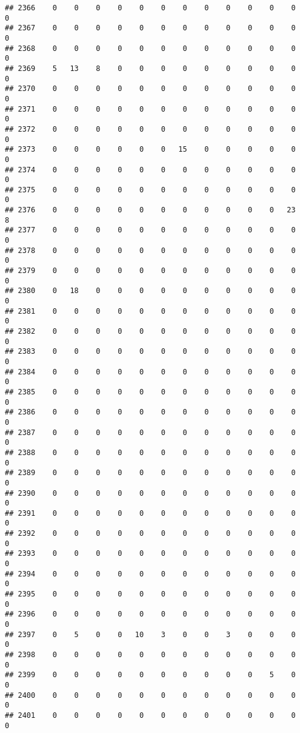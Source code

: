 \documentclass[]{article}
\begin{document}
\begin{verbatim}
## 2366    0    0    0    0    0    0    0    0    0    0    0    0    0
## 2367    0    0    0    0    0    0    0    0    0    0    0    0    0
## 2368    0    0    0    0    0    0    0    0    0    0    0    0    0
## 2369    5   13    8    0    0    0    0    0    0    0    0    0    0
## 2370    0    0    0    0    0    0    0    0    0    0    0    0    0
## 2371    0    0    0    0    0    0    0    0    0    0    0    0    0
## 2372    0    0    0    0    0    0    0    0    0    0    0    0    0
## 2373    0    0    0    0    0    0   15    0    0    0    0    0    0
## 2374    0    0    0    0    0    0    0    0    0    0    0    0    0
## 2375    0    0    0    0    0    0    0    0    0    0    0    0    0
## 2376    0    0    0    0    0    0    0    0    0    0    0   23    8
## 2377    0    0    0    0    0    0    0    0    0    0    0    0    0
## 2378    0    0    0    0    0    0    0    0    0    0    0    0    0
## 2379    0    0    0    0    0    0    0    0    0    0    0    0    0
## 2380    0   18    0    0    0    0    0    0    0    0    0    0    0
## 2381    0    0    0    0    0    0    0    0    0    0    0    0    0
## 2382    0    0    0    0    0    0    0    0    0    0    0    0    0
## 2383    0    0    0    0    0    0    0    0    0    0    0    0    0
## 2384    0    0    0    0    0    0    0    0    0    0    0    0    0
## 2385    0    0    0    0    0    0    0    0    0    0    0    0    0
## 2386    0    0    0    0    0    0    0    0    0    0    0    0    0
## 2387    0    0    0    0    0    0    0    0    0    0    0    0    0
## 2388    0    0    0    0    0    0    0    0    0    0    0    0    0
## 2389    0    0    0    0    0    0    0    0    0    0    0    0    0
## 2390    0    0    0    0    0    0    0    0    0    0    0    0    0
## 2391    0    0    0    0    0    0    0    0    0    0    0    0    0
## 2392    0    0    0    0    0    0    0    0    0    0    0    0    0
## 2393    0    0    0    0    0    0    0    0    0    0    0    0    0
## 2394    0    0    0    0    0    0    0    0    0    0    0    0    0
## 2395    0    0    0    0    0    0    0    0    0    0    0    0    0
## 2396    0    0    0    0    0    0    0    0    0    0    0    0    0
## 2397    0    5    0    0   10    3    0    0    3    0    0    0    0
## 2398    0    0    0    0    0    0    0    0    0    0    0    0    0
## 2399    0    0    0    0    0    0    0    0    0    0    5    0    0
## 2400    0    0    0    0    0    0    0    0    0    0    0    0    0
## 2401    0    0    0    0    0    0    0    0    0    0    0    0    0

\end{verbatim}
\end{document}
